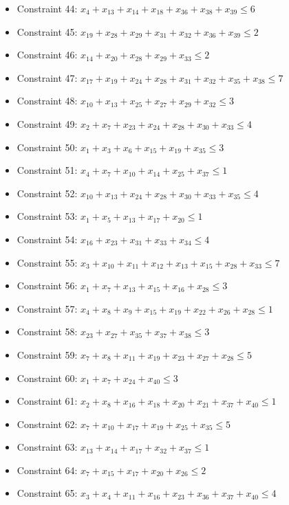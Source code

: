 \documentclass[11pt]{article}
\begin{document}
\begin{itemize}
\item Constraint 44: $x_{4} + x_{13} + x_{14} + x_{18} + x_{36} + x_{38} + x_{39} \le 6$
\item Constraint 45: $x_{19} + x_{28} + x_{29} + x_{31} + x_{32} + x_{36} + x_{39} \le 2$
\item Constraint 46: $x_{14} + x_{20} + x_{28} + x_{29} + x_{33} \le 2$
\item Constraint 47: $x_{17} + x_{19} + x_{24} + x_{28} + x_{31} + x_{32} + x_{35} + x_{38} \le 7$
\item Constraint 48: $x_{10} + x_{13} + x_{25} + x_{27} + x_{29} + x_{32} \le 3$
\item Constraint 49: $x_{2} + x_{7} + x_{23} + x_{24} + x_{28} + x_{30} + x_{33} \le 4$
\item Constraint 50: $x_{1} + x_{3} + x_{6} + x_{15} + x_{19} + x_{35} \le 3$
\item Constraint 51: $x_{4} + x_{7} + x_{10} + x_{14} + x_{25} + x_{37} \le 1$
\item Constraint 52: $x_{10} + x_{13} + x_{24} + x_{28} + x_{30} + x_{33} + x_{35} \le 4$
\item Constraint 53: $x_{1} + x_{5} + x_{13} + x_{17} + x_{20} \le 1$
\item Constraint 54: $x_{16} + x_{23} + x_{31} + x_{33} + x_{34} \le 4$
\item Constraint 55: $x_{3} + x_{10} + x_{11} + x_{12} + x_{13} + x_{15} + x_{28} + x_{33} \le 7$
\item Constraint 56: $x_{1} + x_{7} + x_{13} + x_{15} + x_{16} + x_{28} \le 3$
\item Constraint 57: $x_{4} + x_{8} + x_{9} + x_{15} + x_{19} + x_{22} + x_{26} + x_{28} \le 1$
\item Constraint 58: $x_{23} + x_{27} + x_{35} + x_{37} + x_{38} \le 3$
\item Constraint 59: $x_{7} + x_{8} + x_{11} + x_{19} + x_{23} + x_{27} + x_{28} \le 5$
\item Constraint 60: $x_{1} + x_{7} + x_{24} + x_{40} \le 3$
\item Constraint 61: $x_{2} + x_{8} + x_{16} + x_{18} + x_{20} + x_{21} + x_{37} + x_{40} \le 1$
\item Constraint 62: $x_{7} + x_{10} + x_{17} + x_{19} + x_{25} + x_{35} \le 5$
\item Constraint 63: $x_{13} + x_{14} + x_{17} + x_{32} + x_{37} \le 1$
\item Constraint 64: $x_{7} + x_{15} + x_{17} + x_{20} + x_{26} \le 2$
\item Constraint 65: $x_{3} + x_{4} + x_{11} + x_{16} + x_{23} + x_{36} + x_{37} + x_{40} \le 4$

\end{itemize}
\end{document}
